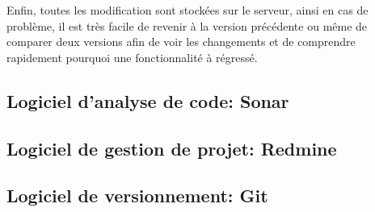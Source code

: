 \documentclass[12pt,a4paper,openany]{book}
\begin{document}
	Enfin, toutes les modification sont stockées sur le serveur, ainsi en cas de problème, il est très facile de revenir à la version précédente ou même de
	comparer deux versions afin de voir les changements et de comprendre rapidement pourquoi une fonctionnalité à régressé. 

	\subsection{Logiciel d'analyse de code: Sonar}
	\subsection{Logiciel de gestion de projet: Redmine}
	\subsection{Logiciel de versionnement: Git}
\end{document}
